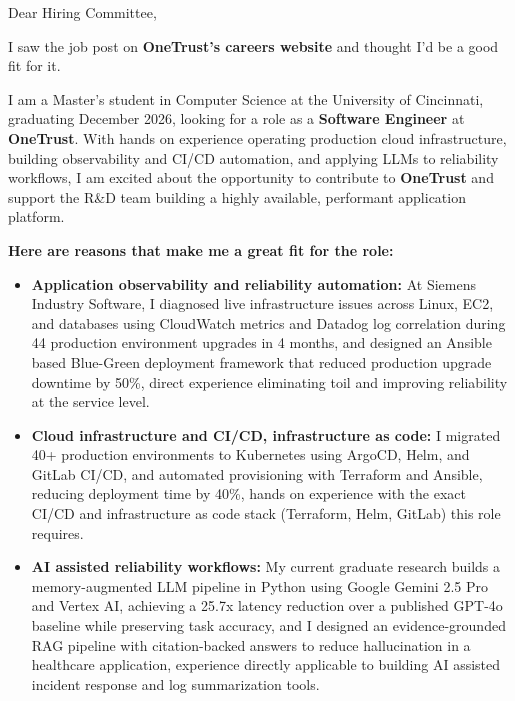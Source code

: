 \documentclass[11pt]{letter}
\date{}
\begin{document}
\begin{letter}{}

\opening{Dear Hiring Committee,}

I saw the job post on \textbf{OneTrust's careers website} and thought I'd be a good fit for it.

I am a Master's student in Computer Science at the University of Cincinnati, graduating December 2026, looking for a role as a \textbf{Software Engineer} at \textbf{OneTrust}. With hands on experience operating production cloud infrastructure, building observability and CI/CD automation, and applying LLMs to reliability workflows, I am excited about the opportunity to contribute to \textbf{OneTrust} and support the R\&D team building a highly available, performant application platform.

\textbf{Here are reasons that make me a great fit for the role:}

\begin{itemize}[leftmargin=*, itemsep=0.45em]
    \item \textbf{Application observability and reliability automation:} At Siemens Industry Software, I diagnosed live infrastructure issues across Linux, EC2, and databases using CloudWatch metrics and Datadog log correlation during 44 production environment upgrades in 4 months, and designed an Ansible based Blue-Green deployment framework that reduced production upgrade downtime by 50\%, direct experience eliminating toil and improving reliability at the service level.

    \item \textbf{Cloud infrastructure and CI/CD, infrastructure as code:} I migrated 40+ production environments to Kubernetes using ArgoCD, Helm, and GitLab CI/CD, and automated provisioning with Terraform and Ansible, reducing deployment time by 40\%, hands on experience with the exact CI/CD and infrastructure as code stack (Terraform, Helm, GitLab) this role requires.

    \item \textbf{AI assisted reliability workflows:} My current graduate research builds a memory-augmented LLM pipeline in Python using Google Gemini 2.5 Pro and Vertex AI, achieving a 25.7x latency reduction over a published GPT-4o baseline while preserving task accuracy, and I designed an evidence-grounded RAG pipeline with citation-backed answers to reduce hallucination in a healthcare application, experience directly applicable to building AI assisted incident response and log summarization tools.


\end{itemize}
\end{letter}
\end{document}
